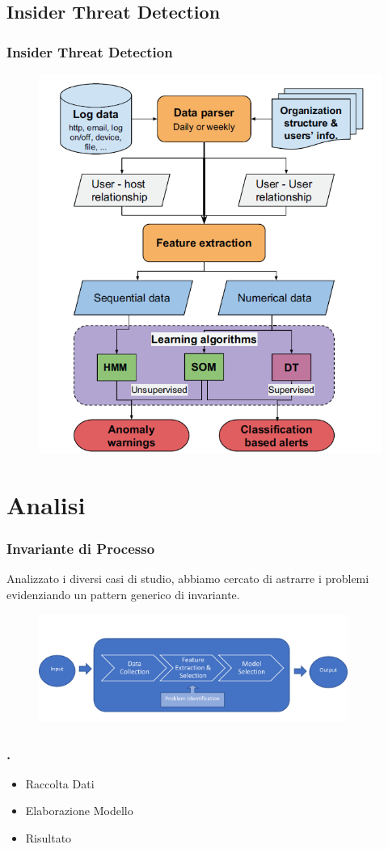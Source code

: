 \documentclass[xcolor=dvipsnames]{beamer}
\begin{document}
\subsection{Insider Threat Detection}
\begin{frame}
    \frametitle{Insider Threat Detection}
    \begin{figure}
        \includegraphics[width=.60\textwidth,height=.80\textheight]{workflowIntrusionThreat.png}
    \end{figure}
\end{frame}

\section{Analisi}

\begin{frame}
    \frametitle{Invariante di Processo}
    Analizzato i diversi casi di studio, abbiamo cercato di astrarre i problemi evidenziando un pattern generico di invariante.
    \begin{figure}[htbp]
        \includegraphics[width=0.9\textwidth]{Immagine3.png}
    \end{figure}
\end{frame}

\begin{frame}
    \frametitle{.}
    \begin{itemize}
        \item Raccolta Dati 
        \item Elaborazione Modello
        \item Risultato
    \end{itemize}
\end{frame}
\end{document}
